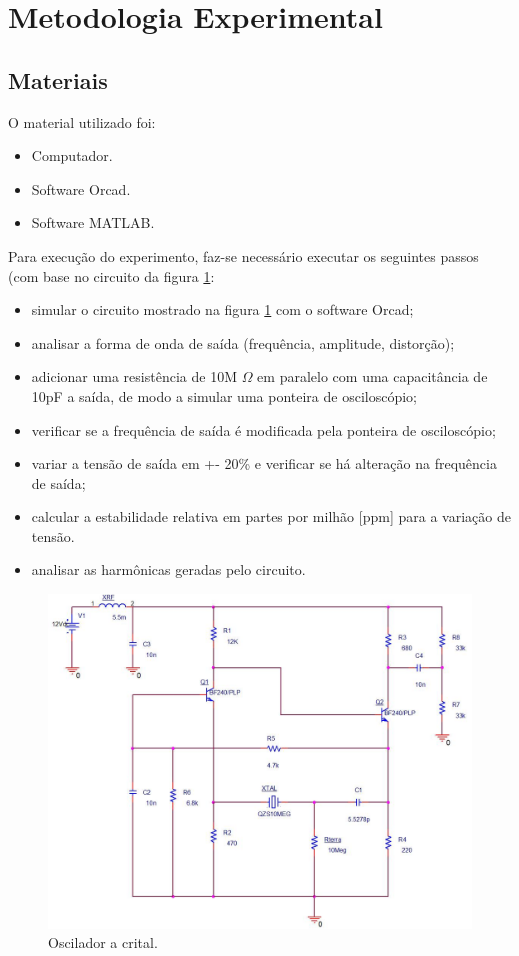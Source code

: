 \newpage
\section{Metodologia Experimental}

\subsection{Materiais}
O material utilizado foi:
\begin{itemize}
\item Computador.
\item Software Orcad.
\item Software MATLAB.

\end{itemize}
Para execução do experimento, faz-se necessário executar os seguintes passos (com base no circuito da figura \ref{f_sch}:

\begin{itemize}

\item simular o circuito mostrado na figura \ref{f_sch} com o software Orcad;
\item analisar a forma de onda de saída (frequência, amplitude, distorção);
\item adicionar uma resistência de 10M $\Omega$ em paralelo com uma capacitância de 10pF a saída, de modo a simular uma ponteira de osciloscópio;
\item verificar se a frequência de saída é modificada pela ponteira de osciloscópio;
\item variar a tensão de saída em +- 20\% e verificar se há alteração na frequência de saída;
\item calcular a estabilidade relativa em partes por milhão [ppm] para a variação de tensão.
\item analisar as harmônicas geradas pelo circuito.
\end{itemize}

\begin{figure}[H]
\centering
\includegraphics[scale=0.3]{Imagens/sch.jpg}
\caption{Oscilador a crital.}
\label{f_sch}
\end{figure}
